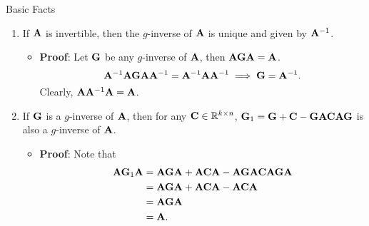 \begin{Remark}{Basic Facts}{}
    \begin{enumerate}[(1)]
        \item If $ \mathbf{A} $ is invertible, then the $ g $-inverse of $ \mathbf{A} $
              is unique and given by $ \mathbf{A}^{-1} $.
              \begin{itemize}
                  \item \textbf{Proof}: Let $ \mathbf{G} $ be any $ g $-inverse of $ \mathbf{A} $, then $ \mathbf{A}\mathbf{G}\mathbf{A}=\mathbf{A} $.
                        \[ \mathbf{A}^{-1}\mathbf{AGA}\mathbf{A}^{-1}=\mathbf{A}^{-1}\mathbf{A}\mathbf{A}^{-1}\implies \mathbf{G}=\mathbf{A}^{-1}. \]
                        Clearly, $ \mathbf{A}\mathbf{A}^{-1}\mathbf{A}=\mathbf{A} $.
              \end{itemize}
        \item If $ \mathbf{G} $ is a $ g $-inverse of $ \mathbf{A} $, then for any $ \mathbf{C}\in\mathbb{R}^{k\times n} $,
              $ \mathbf{G}_1=\mathbf{G}+\mathbf{C}-\mathbf{GACAG} $
              is also a $ g $-inverse of $ \mathbf{A} $.
              \begin{itemize}
                  \item \textbf{Proof}: Note that \begin{align*}
                            \mathbf{A}\mathbf{G}_1 \mathbf{A}
                             & =\mathbf{AGA}+\mathbf{ACA}-\mathbf{AGACAGA} \\
                             & =\mathbf{AGA}+\mathbf{ACA}-\mathbf{ACA}     \\
                             & =\mathbf{AGA}                               \\
                             & =\mathbf{A}.
                        \end{align*}
              \end{itemize}
    \end{enumerate}
\end{Remark}
